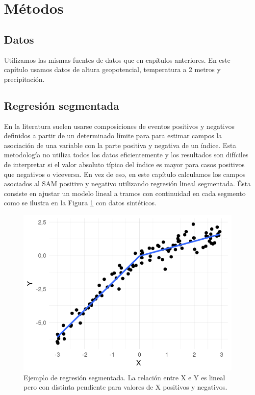 \documentclass[12pt,oneside,a4paper]{reedthesis}
\begin{document}
\hypertarget{muxe9todos-2}{%
\section{Métodos}\label{muxe9todos-2}}

\hypertarget{datos-2}{%
\subsection{Datos}\label{datos-2}}

Utilizamos las mismas fuentes de datos que en capítulos anteriores.
En este capítulo usamos datos de altura geopotencial, temperatura a 2 metros y precipitación.

\hypertarget{regresiuxf3n-segmentada}{%
\subsection{Regresión segmentada}\label{regresiuxf3n-segmentada}}

En la literatura suelen usarse composiciones de eventos positivos y negativos definidos a partir de un determinado límite para para estimar campos la asociación de una variable con la parte positiva y negativa de un índice.
Esta metodología no utiliza todos los datos eficientemente y los resultados son difíciles de interpretar si el valor absoluto típico del índice es mayor para casos positivos que negativos o viceversa.
En vez de eso, en este capítulo calculamos los campos asociados al SAM positivo y negativo utilizando regresión lineal segmentada.
Ésta consiste en ajustar un modelo lineal a tramos con continuidad en cada segmento como se ilustra en la Figura \ref{fig:segmentada-ejemplo} con datos sintéticos.

\begin{figure}

{\centering \includegraphics{figures/30-sam/segmentada-ejemplo-1} 

}

\caption{Ejemplo de regresión segmentada. La relación entre X e Y es lineal pero con distinta pendiente para valores de X positivos y negativos.}\label{fig:segmentada-ejemplo}
\end{figure}
\end{document}
